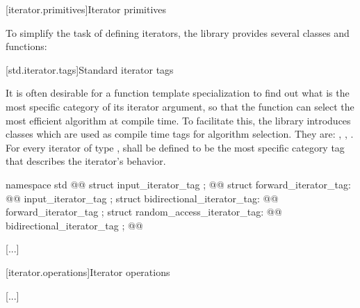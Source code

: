 [iterator.primitives]{Iterator primitives}

\pnum
To simplify the task of defining iterators, the library provides
several classes and functions:

[std.iterator.tags]{Standard iterator tags}

\pnum
{}%
%
%
%
%
%
It is often desirable for a
function template specialization
to find out what is the most specific category of its iterator
argument, so that the function can select the most efficient algorithm at compile time.
To facilitate this, the
library introduces
classes which are used as compile time tags for algorithm selection.
They are:
,
,
\added{,}
\added{,}
.
For every iterator of type
,
shall be defined to be the most specific category tag that describes the
iterator's behavior. 

\begin{codeblock}
namespace std {
  @@
  struct input_iterator_tag { };
  @@
  struct forward_iterator_tag: @@ input_iterator_tag { };
  struct bidirectional_iterator_tag: @@ forward_iterator_tag { };
  struct random_access_iterator_tag: @@ bidirectional_iterator_tag { };
  @\added{ }@
}
\end{codeblock}

[...]

[iterator.operations]{Iterator operations}

[...]

